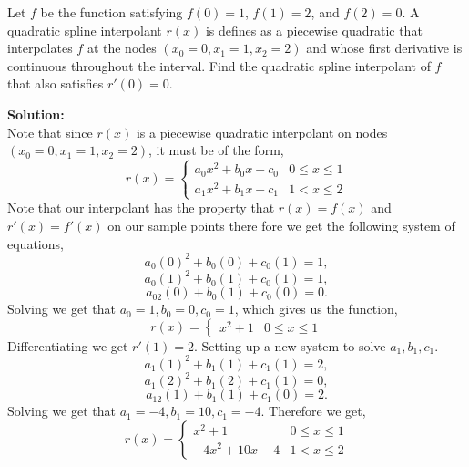 \documentclass[12pt]{article}
\makeatletter
\theoremstyle{homework}
\newenvironment{exercise}[1]
{\def\@currentlabel{#1}\exercisecore}
{\endexercisecore}
\newcommand{\localhead}[1]{\par\smallskip\noindent\textbf{#1}\nobreak\\}%
\newcommand\solution{\localhead{Solution:}}
\makeatother
\begin{document}
\begin{exercise}{Text 8.10} Let $f$ be the function satisfying $f(0) = 1$, $f(1) = 2$, and $f(2) = 0$. A quadratic spline 
  interpolant $r(x)$ is defines as a piecewise quadratic that interpolates $f$ at the nodes $(x_0 = 0, x_1 = 1, x_2 = 2)$
  and whose first derivative is continuous throughout the interval. Find the quadratic spline interpolant of $f$ that also
  satisfies $r'(0) = 0$.\\

\solution Note that since $r(x)$ is a piecewise quadratic interpolant on nodes $(x_0 = 0, x_1 = 1, x_2 = 2)$, it must be of the form,
\begin{equation*}
   r(x) = 
   \begin{cases} 
    a_0x^2+b_0x+c_0 & 0\leq x\leq 1 \\
    a_1x^2+b_1x+c_1 & 1< x\leq 2 
 \end{cases}
\end{equation*}
Note that our interpolant has the property that $r(x) = f(x)$ and $r'(x) = f'(x)$ on our sample points there fore we get the following 
system of equations,
\begin{equation*}
  a_0(0)^2+b_0(0)+c_0(1) = 1,
\end{equation*}
\begin{equation*}
  a_0(1)^2+b_0(1)+c_0(1) = 1,
\end{equation*}
\begin{equation*}
  a_02(0)+b_0(1)+c_0(0) = 0.
\end{equation*}
Solving we get that $a_0 = 1,b_0 = 0,c_0 = 1$, which gives us the function,
\begin{equation*}
  r(x) = \begin{cases} 
    x^2 + 1 & 0 \leq x \leq 1
 \end{cases}
\end{equation*}
Differentiating we get $r'(1) = 2$. Setting up a new system to solve $a_1, b_1, c_1$.
\begin{equation*}
  a_1(1)^2+b_1(1)+c_1(1) = 2,
\end{equation*}
\begin{equation*}
  a_1(2)^2+b_1(2)+c_1(1) = 0,
\end{equation*}
\begin{equation*}
  a_12(1)+b_1(1)+c_1(0) = 2.
\end{equation*}
Solving we get that $a_1 = -4, b_1 = 10, c_1 = -4$. Therefore we get,
\begin{equation*}
  r(x) = 
  \begin{cases} 
    x^2 + 1 & 0\leq x\leq 1 \\
   -4x^2 + 10x - 4 & 1< x\leq 2 
\end{cases}
\end{equation*}
\end{exercise}
\end{document}
